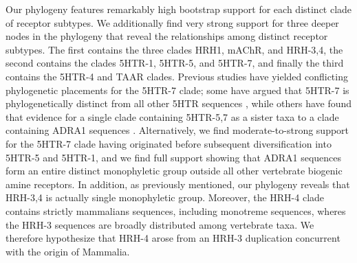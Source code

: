 \documentclass[fleqn,10pt]{wlpeerj}
\begin{document}
Our phylogeny features remarkably high bootstrap support for each distinct clade of receptor subtypes. We additionally find very strong support for three deeper nodes in the phylogeny that reveal the relationships among distinct receptor subtypes. The first contains the three clades HRH1, mAChR, and HRH-3,4, the second contains the clades 5HTR-1, 5HTR-5, and 5HTR-7, and finally the third contains the 5HTR-4 and TAAR clades. Previous studies have yielded conflicting phylogenetic placements for the 5HTR-7 clade; some have argued that 5HTR-7 is phylogenetically distinct from all other 5HTR sequences \citep{KakaralaJamil2014}, while others have found that evidence for a single clade containing 5HTR-5,7 as a sister taxa to a clade containing ADRA1 sequences \citep{Fredrikssonetal2003}. Alternatively, we find moderate-to-strong support for the 5HTR-7 clade having originated before subsequent diversification into 5HTR-5 and 5HTR-1, and we find full support showing that ADRA1 sequences form an entire distinct monophyletic group outside all other vertebrate biogenic amine receptors. In addition, as previously mentioned, our phylogeny reveals that HRH-3,4 is actually single monophyletic group. Moreover, the HRH-4 clade contains strictly mammalians sequences, including monotreme sequences, wheres the HRH-3 sequences are broadly distributed among vertebrate taxa. We therefore hypothesize that HRH-4 arose from an HRH-3 duplication concurrent with the origin of Mammalia.
\end{document}

